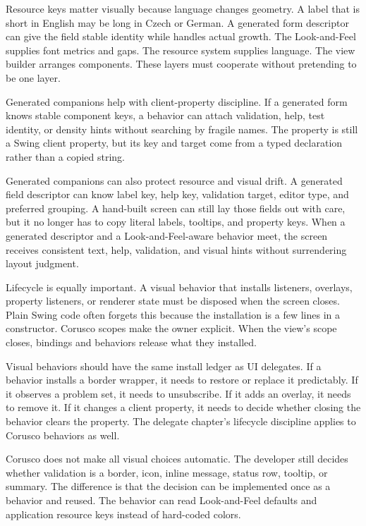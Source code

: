 Resource keys matter visually because language changes geometry. A label that is short in English may be long in Czech or German. A generated form descriptor can give the field stable identity while \miglayout{} handles actual growth. The Look-and-Feel supplies font metrics and gaps. The resource system supplies language. The view builder arranges components. These layers must cooperate without pretending to be one layer.

Generated companions help with client-property discipline. If a generated form knows stable component keys, a behavior can attach validation, help, test identity, or density hints without searching by fragile names. The property is still a Swing client property, but its key and target come from a typed declaration rather than a copied string.

Generated companions can also protect resource and visual drift. A generated field descriptor can know label key, help key, validation target, editor type, and preferred grouping. A hand-built screen can still lay those fields out with care, but it no longer has to copy literal labels, tooltips, and property keys. When a generated descriptor and a Look-and-Feel-aware behavior meet, the screen receives consistent text, help, validation, and visual hints without surrendering layout judgment.

Lifecycle is equally important. A visual behavior that installs listeners, overlays, property listeners, or renderer state must be disposed when the screen closes. Plain Swing code often forgets this because the installation is a few lines in a constructor. Corusco scopes make the owner explicit. When the view's scope closes, bindings and behaviors release what they installed.

Visual behaviors should have the same install ledger as UI delegates. If a behavior installs a border wrapper, it needs to restore or replace it predictably. If it observes a problem set, it needs to unsubscribe. If it adds an overlay, it needs to remove it. If it changes a client property, it needs to decide whether closing the behavior clears the property. The delegate chapter's lifecycle discipline applies to Corusco behaviors as well.

Corusco does not make all visual choices automatic. The developer still decides whether validation is a border, icon, inline message, status row, tooltip, or summary. The difference is that the decision can be implemented once as a behavior and reused. The behavior can read Look-and-Feel defaults and application resource keys instead of hard-coded colors.

